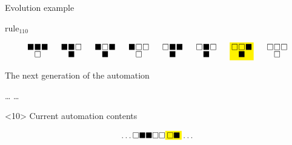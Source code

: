 \documentclass[presentation,aspectratio=169,smaller]{beamer}
\begin{document}
\begin{frame}[label={sec:org812e2ea},t]{Evolution example}
\begin{onlyenv}
\(\text{rule}_{110}\)

\begin{equation*}
  \begingroup
  \setlength\arraycolsep{0.25pt}
  \renewcommand{\arraystretch}{0.5}
  \begin{matrix}
    \blacksquare & \blacksquare & \blacksquare \\
    & \square &
  \end{matrix}\mspace{28mu}
  \begin{matrix}
    \blacksquare & \blacksquare & \square \\
    & \blacksquare &
  \end{matrix}\mspace{28mu}
  \begin{matrix}
    \blacksquare & \square & \blacksquare \\
    & \blacksquare &
  \end{matrix}\mspace{28mu}
  \begin{matrix}
    \blacksquare & \square & \square \\
    & \square &
  \end{matrix}\mspace{28mu}
  \begin{matrix}
    \square & \blacksquare & \blacksquare \\
    & \blacksquare &
  \end{matrix}\mspace{28mu}
  \begin{matrix}
    \square & \blacksquare & \square \\
    & \blacksquare &
  \end{matrix}\mspace{28mu}
  \mathcolorbox{yellow}{
    \begin{matrix}
      \square & \square & \blacksquare \\
      & \blacksquare &
    \end{matrix}
  }\mspace{28mu}
  \begin{matrix}
    \square & \square & \square \\
    & \square &
  \end{matrix}
  \endgroup
\end{equation*}

The next generation of the automation

\hfill \dots
\blacksquare
\blacksquare
\blacksquare
\square
\square
{}
\mspace{14mu}
\dots \hfill
\end{onlyenv}

\begin{onlyenv}<10>
Current automation contents

\begin{equation*}
  \hfill
  \dots
  \square
  \blacksquare
  \blacksquare
  \square
  \square
  \mathcolorbox{yellow}{
    \square
    \blacksquare
  }
  \dots
  \hfill
\end{equation*}


\end{onlyenv}
\end{frame}
\end{document}
